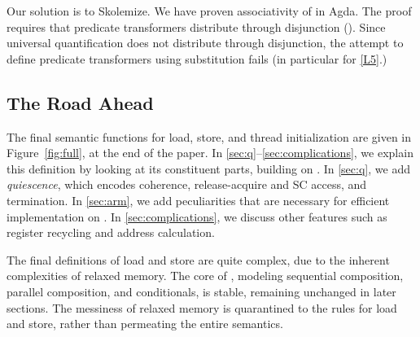 \begin{example}
  Our solution is to Skolemize.  We have proven associativity of
   in Agda.  The proof requires that predicate
  transformers distribute through disjunction ().
  Since universal quantification does not distribute through disjunction, the
  attempt to define predicate transformers using substitution fails (in
  particular for \ref{L5}.)
\end{example}

\subsection{The Road Ahead}

The final semantic functions for load, store, and thread initialization
are given in Figure~\ref{fig:full}, at the end of the paper.
In \textsection\ref{sec:q}--\ref{sec:complications}, we explain this definition by looking at its
constituent parts, building on .  In
\textsection\ref{sec:q}, we add \emph{quiescence}, which encodes coherence,
release-acquire and SC access, and termination.  In
\textsection\ref{sec:arm}, we add peculiarities that are necessary for
efficient implementation on \armeight.  In
\textsection\ref{sec:complications}, we discuss other features such as
register recycling and address calculation.

The final definitions of load and store are quite complex, due to the
inherent complexities of relaxed memory.  The core of
, modeling sequential composition, parallel
composition, and conditionals, is stable, remaining unchanged in later
sections.  The messiness of relaxed memory is quarantined to the rules
for load and store, rather than permeating the entire semantics.


